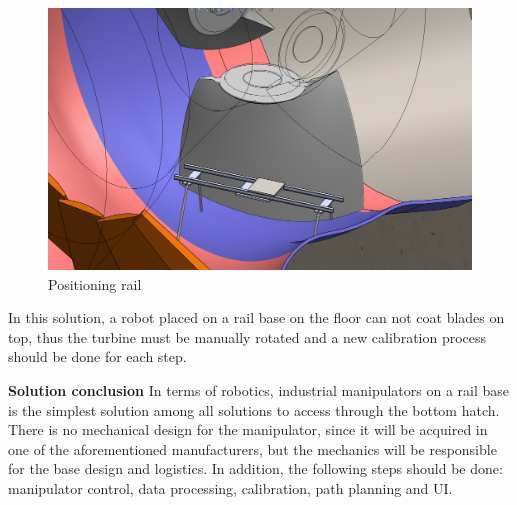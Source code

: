 \begin{figure}[h!]	
	\includegraphics[width=\columnwidth]{figs/manipuladores/rail2.PNG}
	\caption{Positioning rail}
	\label{fig::rail2}
\end{figure}

In this solution, a robot placed on a rail base on the floor can not coat
blades on top, thus the turbine must be manually rotated and a new calibration process should be done
for each step.


\textbf{Solution conclusion}
In terms of robotics, industrial manipulators on a rail base is the simplest
solution among all solutions to access through the bottom hatch. There is no
mechanical design for the manipulator, since it will be acquired in one of the
aforementioned manufacturers, but the mechanics will be responsible for the base
design and logistics. In addition, the following steps should be done:
manipulator control, data processing, calibration, path planning and UI.

